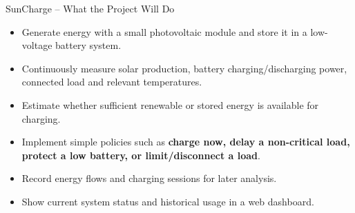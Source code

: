\begin{frame}{SunCharge -- What the Project Will Do}
\small
\begin{itemize}
    \item Generate energy with a small photovoltaic module and store it in a low-voltage battery system.
    \item Continuously measure solar production, battery charging/discharging power, connected load and relevant temperatures.
    \item Estimate whether sufficient renewable or stored energy is available for charging.
    \item Implement simple policies such as \textbf{charge now, delay a non-critical load, protect a low battery, or limit/disconnect a load}.
    \item Record energy flows and charging sessions for later analysis.
    \item Show current system status and historical usage in a web dashboard.
\end{itemize}
\end{frame}
